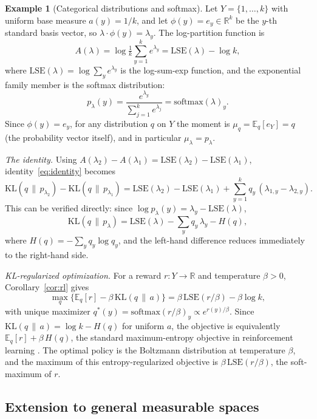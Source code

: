 \documentclass[11pt, a4paper, 
onecolumn, 
showabstract]{naverlabseurope-onecol-flex}
\theoremstyle{definition}
\newtheorem{example}[theorem]{Example}
\theoremstyle{remark}
\newcommand{\KL}[2]{\mathrm{KL}\!\left(#1 \,\|\, #2\right)}
\newcommand{\E}{\mathbb{E}}
\newcommand{\R}{\mathbb{R}}
\begin{document}
\begin{example}[Categorical distributions and softmax]\label{ex:categorical}
Let $Y = \{1,\ldots,k\}$ with uniform base measure $a(y) = 1/k$, and let $\phi(y) = e_y \in \R^k$ be the $y$-th standard basis vector, so $\lambda \cdot \phi(y) = \lambda_y$.
The log-partition function is
\[
    A(\lambda)
    = \log \tfrac{1}{k}\textstyle\sum_{y=1}^k e^{\lambda_y}
    = \mathrm{LSE}(\lambda) - \log k,
\]
where $\mathrm{LSE}(\lambda) = \log\sum_y e^{\lambda_y}$ is the log-sum-exp function, and the exponential family member is the softmax distribution:
\[
    p_\lambda(y) = \frac{e^{\lambda_y}}{\sum_{j=1}^k e^{\lambda_j}} = \mathrm{softmax}(\lambda)_y.
\]
Since $\phi(y) = e_y$, for any distribution $q$ on $Y$ the moment is $\mu_q = \E_q[e_Y] = q$ (the probability vector itself), and in particular $\mu_\lambda = p_\lambda$.

\smallskip\noindent\textit{The identity.}
Using $A(\lambda_2) - A(\lambda_1) = \mathrm{LSE}(\lambda_2) - \mathrm{LSE}(\lambda_1)$, identity~\eqref{eq:identity} becomes
\[
    \KL{q}{p_{\lambda_2}} - \KL{q}{p_{\lambda_1}}
    = \mathrm{LSE}(\lambda_2) - \mathrm{LSE}(\lambda_1)
      + \sum_{y=1}^k q_y\,(\lambda_{1,y} - \lambda_{2,y}).
\]
This can be verified directly: since $\log p_\lambda(y) = \lambda_y - \mathrm{LSE}(\lambda)$,
\[
    \KL{q}{p_\lambda} = \mathrm{LSE}(\lambda) - \textstyle\sum_y q_y\,\lambda_y - H(q),
\]
where $H(q) = -\sum_y q_y \log q_y$, and the left-hand difference reduces immediately to the right-hand side.

\smallskip\noindent\textit{KL-regularized optimization.}
For a reward $r \colon Y \to \R$ and temperature $\beta > 0$, Corollary~\ref{cor:rl} gives
\[
    \max_q \bigl\{\E_q[r] - \beta\,\KL{q}{a}\bigr\}
    = \beta\,\mathrm{LSE}(r/\beta) - \beta\log k,
\]
with unique maximizer $q^*(y) = \mathrm{softmax}(r/\beta)_y \propto e^{r(y)/\beta}$.
Since $\KL{q}{a} = \log k - H(q)$ for uniform $a$, the objective is equivalently
$\E_q[r] + \beta\,H(q)$, the standard maximum-entropy objective in reinforcement
learning \cite{Ziebart2010,Haarnoja2018}.
The optimal policy is the Boltzmann distribution at temperature $\beta$, and the
maximum of this entropy-regularized objective is $\beta\,\mathrm{LSE}(r/\beta)$,
the soft-maximum of $r$.
\end{example}



\subsection*{Extension to general measurable spaces}
\end{document}
